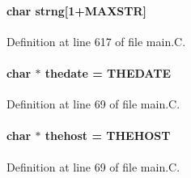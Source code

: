 \paragraph{\setlength{\rightskip}{0pt plus 5cm}char strng[1+MAXSTR]\hspace{0.3cm}{\tt  [static]}}\hfill



Definition at line 617 of file main.C.\label{main.C_a21}
\paragraph{\setlength{\rightskip}{0pt plus 5cm}char $\ast$ thedate = THEDATE}\hfill



Definition at line 69 of file main.C.\label{main.C_a22}
\paragraph{\setlength{\rightskip}{0pt plus 5cm}char $\ast$ thehost = THEHOST}\hfill



Definition at line 69 of file main.C.